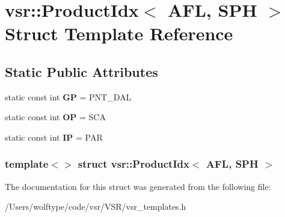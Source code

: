 \hypertarget{structvsr_1_1_product_idx_3_01_a_f_l_00_01_s_p_h_01_4}{\section{vsr\-:\-:Product\-Idx$<$ A\-F\-L, S\-P\-H $>$ Struct Template Reference}
\label{structvsr_1_1_product_idx_3_01_a_f_l_00_01_s_p_h_01_4}
}
\subsection*{Static Public Attributes}
\begin{DoxyCompactItemize}
\item 
\hypertarget{structvsr_1_1_product_idx_3_01_a_f_l_00_01_s_p_h_01_4_a3c29acbd64625d02b597118e0adc04bf}{static const int {\bfseries G\-P} = P\-N\-T\-\_\-\-D\-A\-L}\label{structvsr_1_1_product_idx_3_01_a_f_l_00_01_s_p_h_01_4_a3c29acbd64625d02b597118e0adc04bf}

\item 
\hypertarget{structvsr_1_1_product_idx_3_01_a_f_l_00_01_s_p_h_01_4_af7a657821fe915940d3822ba4cdbaf77}{static const int {\bfseries O\-P} = S\-C\-A}\label{structvsr_1_1_product_idx_3_01_a_f_l_00_01_s_p_h_01_4_af7a657821fe915940d3822ba4cdbaf77}

\item 
\hypertarget{structvsr_1_1_product_idx_3_01_a_f_l_00_01_s_p_h_01_4_ae13bc61430440a3e58d3cc5b508e6bef}{static const int {\bfseries I\-P} = P\-A\-R}\label{structvsr_1_1_product_idx_3_01_a_f_l_00_01_s_p_h_01_4_ae13bc61430440a3e58d3cc5b508e6bef}

\end{DoxyCompactItemize}
\subsubsection*{template$<$$>$ struct vsr\-::\-Product\-Idx$<$ A\-F\-L, S\-P\-H $>$}



The documentation for this struct was generated from the following file\-:\begin{DoxyCompactItemize}
\item 
/\-Users/wolftype/code/vsr/\-V\-S\-R/vsr\-\_\-templates.\-h\end{DoxyCompactItemize}
